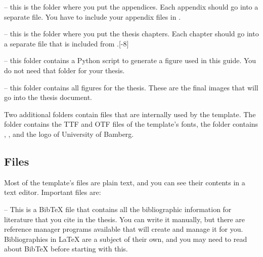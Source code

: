 -- this is the folder where you put the appendices. Each appendix should go into a separate  file. You have to include your appendix files in .

 -- this is the folder where you put the thesis chapters. Each chapter should go into a separate  file that is included from .[-8\baselineskip] 

 -- this folder contains a Python script to generate a figure used in this guide. You do not need that folder for your thesis.

 -- this folder contains all figures for the thesis. These are the final images that will go into the thesis document.

Two additional folders contain files that are internally used by the template. The folder  contains the TTF and OTF files of the template's fonts, the folder  contains , , and the logo of University of Bamberg.

\subsection{Files}
\label{sec:files}

Most of the template's files are plain text, and you can see their contents in a text editor. Important files are:

 -- This is a BibTeX file that contains all the bibliographic information for literature that you cite in the thesis. You can write it manually, but there are reference manager programs available that will create and manage it for you. Bibliographies in LaTeX are a subject of their own, and you may need to read about BibTeX before starting with this.

